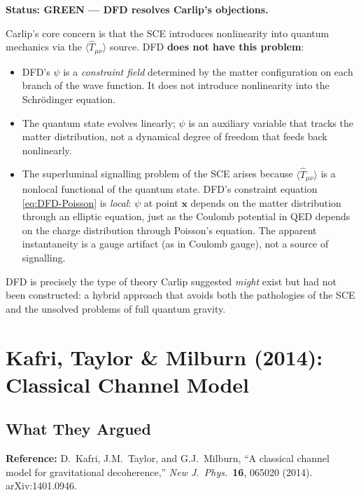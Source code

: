 \documentclass[12pt,a4paper]{article}
\newcommand{\GREEN}{\textcolor{dfdgreen}{\textbf{GREEN}}}
\begin{document}
\textbf{Status: \GREEN{} --- DFD resolves Carlip's objections.}

Carlip's core concern is that the SCE introduces nonlinearity into quantum mechanics via the $\langle\hat{T}_{\mu\nu}\rangle$ source. DFD \textbf{does not have this problem}:

\begin{itemize}
\item DFD's $\psi$ is a \emph{constraint field} determined by the matter configuration on each branch of the wave function. It does not introduce nonlinearity into the Schr\"odinger equation.
\item The quantum state evolves linearly; $\psi$ is an auxiliary variable that tracks the matter distribution, not a dynamical degree of freedom that feeds back nonlinearly.
\item The superluminal signalling problem of the SCE arises because $\langle\hat{T}_{\mu\nu}\rangle$ is a nonlocal functional of the quantum state. DFD's constraint equation \eqref{eq:DFD-Poisson} is \emph{local}: $\psi$ at point $\mathbf{x}$ depends on the matter distribution through an elliptic equation, just as the Coulomb potential in QED depends on the charge distribution through Poisson's equation. The apparent instantaneity is a gauge artifact (as in Coulomb gauge), not a source of signalling.
\end{itemize}

DFD is precisely the type of theory Carlip suggested \emph{might} exist but had not been constructed: a hybrid approach that avoids both the pathologies of the SCE and the unsolved problems of full quantum gravity.


\section{Kafri, Taylor \& Milburn (2014): Classical Channel Model}
\label{sec:kafri}

\subsection{What They Argued}

\textbf{Reference:} D.\ Kafri, J.M.\ Taylor, and G.J.\ Milburn, ``A classical channel model for gravitational decoherence,'' \textit{New J.\ Phys.}\ \textbf{16}, 065020 (2014). arXiv:1401.0946.
\end{document}
